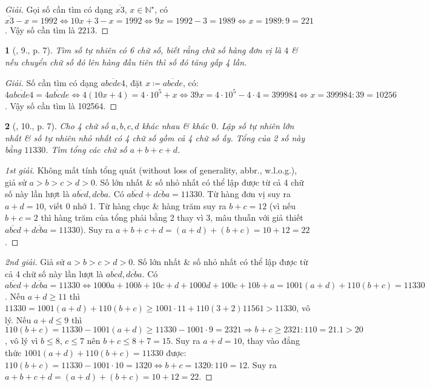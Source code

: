 \documentclass{article}
\newtheorem{baitoan}{}
\begin{document}
\begin{proof}[Giải]
	Gọi số cần tìm có dạng $\overline{x3}$, $x\in\mathbb{N}^\star$, có $\overline{x3} - x = 1992\Leftrightarrow10x + 3 - x = 1992\Leftrightarrow9x = 1992 - 3 = 1989\Leftrightarrow x = 1989:9 = 221$. Vậy số cần tìm là $2213$.
\end{proof}

\begin{baitoan}[\cite{Binh_Toan_6_tap_1}, 9., p. 7]
	Tìm số tự nhiên có 6 chữ số, biết rằng chữ số hàng đơn vị là $4$ \& nếu chuyển chữ số đó lên hàng đầu tiên thì số đó tăng gấp 4 lần.
\end{baitoan}

\begin{proof}[Giải]
	Số cần tìm có dạng $\overline{abcde4}$, đặt $x\coloneqq\overline{abcde}$, có: $4\overline{abcde4} = \overline{4abcde}\Leftrightarrow4(10x + 4) = 4\cdot10^5 + x\Leftrightarrow39x = 4\cdot10^5 - 4\cdot4 = 399984\Leftrightarrow x = 399984:39 = 10256$. Vậy số cần tìm là 102564.
\end{proof}

\begin{baitoan}[\cite{Binh_Toan_6_tap_1}, 10., p. 7]
	Cho 4 chữ số $a,b,c,d$ khác nhau \& khác $0$. Lập số tự nhiên lớn nhất \& số tự nhiên nhỏ nhất có 4 chữ số gồm cả 4 chữ số ấy. Tổng của 2 số này bằng $11330$. Tìm tổng các chữ số $a + b + c + d$.
\end{baitoan}

\begin{proof}[1st giải]
	Không mất tính tổng quát (without loss of generality, abbr., w.l.o.g.), giả sử $a > b > c > d > 0$. Số lớn nhất \& số nhỏ nhất có thể lập được từ cả 4 chữ số này lần lượt là $\overline{abcd},\overline{dcba}$. Có $\overline{abcd} + \overline{dcba} = 11330$. Từ hàng đơn vị suy ra $a + d = 10$, viết 0 nhớ 1. Từ hàng chục \& hàng trăm suy ra $b + c = 12$ (vì nếu $b + c = 2$ thì hàng trăm của tổng phải bằng 2 thay vì 3, mâu thuẫn với giả thiết $\overline{abcd} + \overline{dcba} = 11330$). Suy ra $a + b + c + d = (a + d) + (b + c) = 10 + 12 = 22$.
\end{proof}

\begin{proof}[2nd giải]
	Giả sử $a > b > c > d > 0$. Số lớn nhất \& số nhỏ nhất có thể lập được từ cả 4 chữ số này lần lượt là $\overline{abcd},\overline{dcba}$. Có $\overline{abcd} + \overline{dcba} = 11330\Leftrightarrow1000a + 100b + 10c + d + 1000d + 100c + 10b + a = 1001(a + d) + 110(b + c) = 11330$. Nếu $a + d\ge11$ thì $11330 = 1001(a + d) + 110(b + c)\ge1001\cdot11 + 110(3 + 2) 11561 > 11330$, vô lý. Nếu $a + d\le9$ thì $110(b + c) = 11330 - 1001(a + d)\ge11330 - 1001\cdot9 = 2321\Rightarrow b + c\ge2321:110 = 21.1 > 20$, vô lý vì $b\le8$, $c\le7$ nên $b + c\le 8 + 7 = 15$. Suy ra $a + d = 10$, thay vào đẳng thức $1001(a + d) + 110(b + c) = 11330$ được: $110(b + c) = 11330 - 1001\cdot10 = 1320\Leftrightarrow b + c = 1320:110 = 12$. Suy ra $a + b + c + d = (a + d) + (b + c) = 10 + 12 = 22$.
\end{proof}
\end{document}

